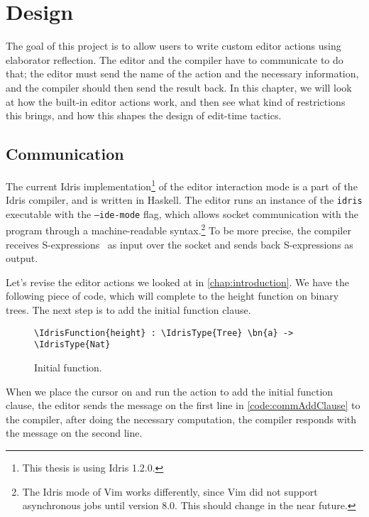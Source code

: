 \chapter{Design}\label{chap:design}
The goal of this project is to allow users to write custom editor actions using
elaborator reflection.
The editor and the compiler have to communicate to do that; the editor must
send the name of the action and the necessary information, and the
compiler should then send the result back.
In this chapter, we will look at how the built-in editor actions work, and then
see what kind of restrictions this brings, and how this shapes the design of
edit-time tactics.

\section{Communication}\label{sec:communication}

The current Idris implementation\footnote{This thesis is using Idris 1.2.0.} of
the editor interaction mode is a part of the Idris compiler, and is written in
Haskell.
The editor runs an instance of the \texttt{idris} executable with the
\texttt{--ide-mode} flag, which
allows socket communication with the program through a machine-readable
syntax.\footnote{The Idris mode of Vim works differently, since Vim did not
support asynchronous jobs until version 8.0. This should change in the near future.}
To be more precise, the compiler receives S-expressions~\cite{mccarthy} as input
over the socket and sends back S-expressions as output.

Let's revise the editor actions we looked at in \autoref{chap:introduction}.
We have the following piece of code, which will complete to the height function
on binary trees. The next step is to add the initial function clause.

\begin{figure}[ht]
\caption{Initial  function.}
\begin{Verbatim}[framesep=2mm, label=\footnotesize{\normalfont{Idris}}, labelposition=topline]
\IdrisFunction{height} : \IdrisType{Tree} \bn{a} -> \IdrisType{Nat}
\end{Verbatim}
\end{figure}

When we place the cursor on  and run the action to add the initial
function clause, the editor sends the message on the first line in
\autoref{code:commAddClause} to the compiler, after doing the necessary
computation, the compiler responds with the message on the second line.

